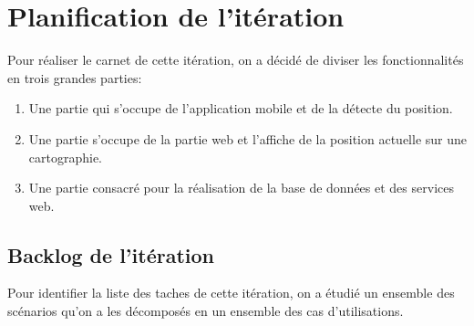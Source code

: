 


\section{Planification de l'itération}

Pour réaliser le carnet de cette itération, on a décidé de diviser les
fonctionnalités en trois grandes parties:

\begin{enumerate}
    \item Une partie qui s'occupe de l'application mobile et de la détecte du
        position.
    \item Une partie  s'occupe de la partie web et l'affiche de la position
        actuelle sur une cartographie.
    \item Une partie consacré pour la réalisation de la base de données et des
        services web.
\end{enumerate}

\subsection{Backlog de l'itération}

Pour identifier la liste des taches de cette itération, on a étudié un ensemble
des scénarios qu'on a les décomposés en un ensemble des cas d'utilisations.


